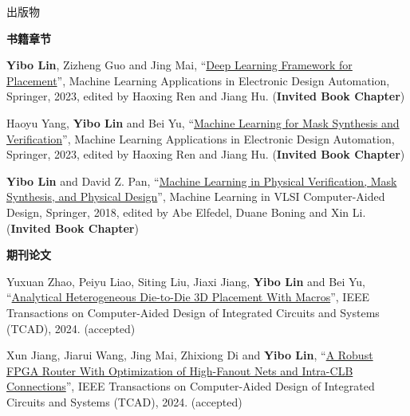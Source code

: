\begin{rSection}{出版物}



\textbf{书籍章节}
        

\begin{description}[font=\normalfont, rightmargin=2em]
    

\item[{[B3]}]{
        \textbf{Yibo Lin}, Zizheng Guo and Jing Mai, 
    ``\href{https://doi.org/10.1007/978-3-031-13074-8}{Deep Learning Framework for Placement}'', 
    Machine Learning Applications in Electronic Design Automation, Springer, 2023, edited by Haoxing Ren and Jiang Hu.
    (\textbf{Invited Book Chapter})
}
            

\item[{[B2]}]{
        Haoyu Yang, \textbf{Yibo Lin} and Bei Yu, 
    ``\href{https://doi.org/10.1007/978-3-031-13074-8}{Machine Learning for Mask Synthesis and Verification}'', 
    Machine Learning Applications in Electronic Design Automation, Springer, 2023, edited by Haoxing Ren and Jiang Hu.
    (\textbf{Invited Book Chapter})
}
            

\item[{[B1]}]{
        \textbf{Yibo Lin} and David Z. Pan, 
    ``\href{http://dx.doi.org/10.1007/978-3-030-04666-8_4}{Machine Learning in Physical Verification, Mask Synthesis, and Physical Design}'', 
    Machine Learning in VLSI Computer-Aided Design, Springer, 2018, edited by Abe Elfedel, Duane Boning and Xin Li.
    (\textbf{Invited Book Chapter})
}
            

\end{description}
    

\textbf{期刊论文}
        

\begin{description}[font=\normalfont, rightmargin=2em]
    

\item[{[J54]}]{
        Yuxuan Zhao, Peiyu Liao, Siting Liu, Jiaxi Jiang, \textbf{Yibo Lin} and Bei Yu, 
    ``\href{https://doi.org/10.1109/TCAD.2024.3444716}{Analytical Heterogeneous Die-to-Die 3D Placement With Macros}'', 
    IEEE Transactions on Computer-Aided Design of Integrated Circuits and Systems (TCAD), 2024.
    (accepted)
}
            

\item[{[J53]}]{
        Xun Jiang, Jiarui Wang, Jing Mai, Zhixiong Di and \textbf{Yibo Lin}, 
    ``\href{https://doi.org/10.1109/TCAD.2024.3447218}{A Robust FPGA Router With Optimization of High-Fanout Nets and Intra-CLB Connections}'', 
    IEEE Transactions on Computer-Aided Design of Integrated Circuits and Systems (TCAD), 2024.
    (accepted)
}
            


\end{description}
\end{rSection}
